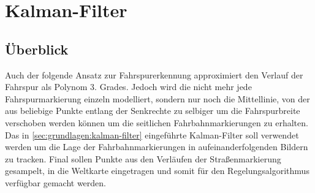 \section{Kalman-Filter}

\subsection{Überblick} \label{ssec:fahrspurerkennung:kalman-filter:ueberblick}
Auch der folgende Ansatz zur Fahrspurerkennung approximiert den Verlauf der Fahrspur als Polynom 3. Grades. Jedoch wird die nicht mehr jede Fahrspurmarkierung einzeln modelliert, sondern nur noch die Mittellinie, von der aus beliebige Punkte entlang der Senkrechte zu selbiger um die Fahrspurbreite verschoben werden können um die seitlichen Fahrbahnmarkierungen zu erhalten.
Das in \ref{sec:grundlagen:kalman-filter} eingeführte Kalman-Filter soll verwendet werden um die Lage der Fahrbahnmarkierungen in aufeinanderfolgenden Bildern zu tracken. Final sollen Punkte aus den Verläufen der Straßenmarkierung gesampelt, in die Weltkarte eingetragen und somit für den Regelungsalgorithmus verfügbar gemacht werden.

